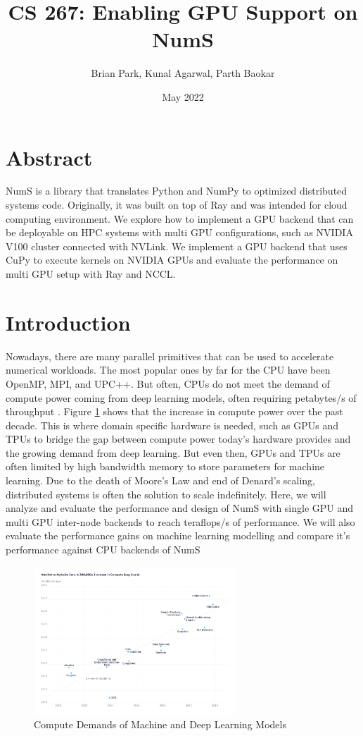 \documentclass{article}
\title{CS 267: Enabling GPU Support on NumS}
\author{Brian Park, Kunal Agarwal, Parth Baokar}
\date{May 2022}
\begin{document}
\maketitle

\section*{Abstract}
NumS is a library that translates Python and NumPy to optimized distributed systems code. Originally, it was built on top of Ray and was intended for cloud computing environment. We explore how to implement a GPU backend that can be deployable on HPC systems with multi GPU configurations, such as NVIDIA V100 cluster connected with NVLink. We implement a GPU backend that uses CuPy to execute kernels on NVIDIA GPUs and evaluate the performance on multi GPU setup with Ray and NCCL.

\section{Introduction}
Nowadays, there are many parallel primitives that can be used to accelerate numerical workloads. The most popular ones by far for the CPU have been OpenMP, MPI, and UPC++. But often, CPUs do not meet the demand of compute power coming from deep learning models, often requiring petabytes/s of throughput \cite{openai}. Figure \ref{fig:openai} shows that the increase in compute power over the past decade. This is where domain specific hardware is needed, such as GPUs and TPUs to bridge the gap between compute power today's hardware provides and the growing demand from deep learning. But even then, GPUs and TPUs are often limited by high bandwidth memory to store parameters for machine learning. Due to the death of Moore's Law and end of Denard's scaling, distributed systems is often the solution to scale indefinitely. Here, we will analyze and evaluate the performance and design of NumS with single GPU and multi GPU inter-node backends to reach teraflops/s of performance. We will also evaluate the performance gains on machine learning modelling and compare it's performance against CPU backends of NumS

\begin{figure}
  \centerline{\includegraphics[width=3in]{figures/ai-and-compute-modern-log.png}}
  \caption{Compute Demands of Machine and Deep Learning Models}
  \label{fig:openai}
\end{figure}
\end{document}
